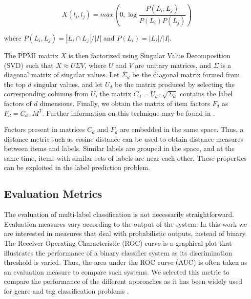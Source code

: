 \documentclass{article}
\begin{document}
\begin{equation}
X(l_i,l_j) =
max\left(0,\log{\frac{P(L_i,L_j)
  }{
    P(L_i)P(L_j)
  }}\right)
\end{equation}

where $P(L_i,L_j) = |L_i \cap L_j| / |I|$ and $P(L_i) = |L_i| / |I|$.

The PPMI matrix $X$ is then factorized using Singular Value Decomposition (SVD) such that $X \approx U \Sigma V$, where $U$ and $V$ are unitary matrices, and $\Sigma$ is a diagonal matrix of singular values. Let $\Sigma_d$ be the diagonal matrix formed from the top $d$ singular values, and let $U_d$ be the matrix produced by selecting the corresponding columns from $U$, the matrix $C_d = U_d \cdot \sqrt{\Sigma_d}$ contains the label factors of $d$ dimensions. Finally, we obtain the matrix of item factors $F_d$ as $F_d = C_d \cdot M^T$. Further information on this technique may be found in \cite{levy2014neural}.

Factors present in matrices $C_d$ and $F_d$ are embedded in the same space. Thus, a distance metric such as cosine distance can be used to obtain distance measures between items and labels. Similar labels are grouped in the space, and at the same time, items with similar sets of labels are near each other. These properties can be exploited in the label prediction problem.


\subsection{Evaluation Metrics}\label{sec:metrics}

The evaluation of multi-label classification is not necessarily straightforward. 
Evaluation measures vary according to the output of the system. 
In this work we are interested in measures that deal with probabilistic outputs, instead of binary. 
The Receiver Operating Characteristic (ROC) curve is a graphical plot that illustrates the performance of a binary classifier system as its discrimination threshold is varied. 
Thus, the area under the ROC curve (AUC) is often taken as an evaluation measure to compare such systems. 
We selected this metric to compare the performance of the different approaches as it has been widely used for genre and tag classification problems \cite{Choi2016,dieleman2014end}. 
\end{document}
